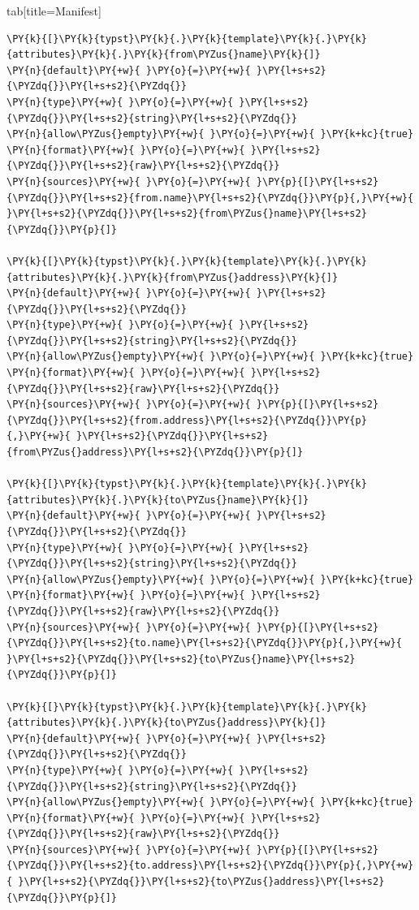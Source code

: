 \documentclass[a4paper,twoside]{article}
\begin{document}
\begin{tsdiv}{tab}[title=Manifest]
\begin{tscode}[lang=toml, engine=pygments]
\begin{Verbatim}[commandchars=\\\{\},breaklines, breakanywhere, commandchars=\\\{\}]
\PY{k}{[}\PY{k}{typst}\PY{k}{.}\PY{k}{template}\PY{k}{.}\PY{k}{attributes}\PY{k}{.}\PY{k}{from\PYZus{}name}\PY{k}{]}
\PY{n}{default}\PY{+w}{ }\PY{o}{=}\PY{+w}{ }\PY{l+s+s2}{\PYZdq{}}\PY{l+s+s2}{\PYZdq{}}
\PY{n}{type}\PY{+w}{ }\PY{o}{=}\PY{+w}{ }\PY{l+s+s2}{\PYZdq{}}\PY{l+s+s2}{string}\PY{l+s+s2}{\PYZdq{}}
\PY{n}{allow\PYZus{}empty}\PY{+w}{ }\PY{o}{=}\PY{+w}{ }\PY{k+kc}{true}
\PY{n}{format}\PY{+w}{ }\PY{o}{=}\PY{+w}{ }\PY{l+s+s2}{\PYZdq{}}\PY{l+s+s2}{raw}\PY{l+s+s2}{\PYZdq{}}
\PY{n}{sources}\PY{+w}{ }\PY{o}{=}\PY{+w}{ }\PY{p}{[}\PY{l+s+s2}{\PYZdq{}}\PY{l+s+s2}{from.name}\PY{l+s+s2}{\PYZdq{}}\PY{p}{,}\PY{+w}{ }\PY{l+s+s2}{\PYZdq{}}\PY{l+s+s2}{from\PYZus{}name}\PY{l+s+s2}{\PYZdq{}}\PY{p}{]}

\PY{k}{[}\PY{k}{typst}\PY{k}{.}\PY{k}{template}\PY{k}{.}\PY{k}{attributes}\PY{k}{.}\PY{k}{from\PYZus{}address}\PY{k}{]}
\PY{n}{default}\PY{+w}{ }\PY{o}{=}\PY{+w}{ }\PY{l+s+s2}{\PYZdq{}}\PY{l+s+s2}{\PYZdq{}}
\PY{n}{type}\PY{+w}{ }\PY{o}{=}\PY{+w}{ }\PY{l+s+s2}{\PYZdq{}}\PY{l+s+s2}{string}\PY{l+s+s2}{\PYZdq{}}
\PY{n}{allow\PYZus{}empty}\PY{+w}{ }\PY{o}{=}\PY{+w}{ }\PY{k+kc}{true}
\PY{n}{format}\PY{+w}{ }\PY{o}{=}\PY{+w}{ }\PY{l+s+s2}{\PYZdq{}}\PY{l+s+s2}{raw}\PY{l+s+s2}{\PYZdq{}}
\PY{n}{sources}\PY{+w}{ }\PY{o}{=}\PY{+w}{ }\PY{p}{[}\PY{l+s+s2}{\PYZdq{}}\PY{l+s+s2}{from.address}\PY{l+s+s2}{\PYZdq{}}\PY{p}{,}\PY{+w}{ }\PY{l+s+s2}{\PYZdq{}}\PY{l+s+s2}{from\PYZus{}address}\PY{l+s+s2}{\PYZdq{}}\PY{p}{]}

\PY{k}{[}\PY{k}{typst}\PY{k}{.}\PY{k}{template}\PY{k}{.}\PY{k}{attributes}\PY{k}{.}\PY{k}{to\PYZus{}name}\PY{k}{]}
\PY{n}{default}\PY{+w}{ }\PY{o}{=}\PY{+w}{ }\PY{l+s+s2}{\PYZdq{}}\PY{l+s+s2}{\PYZdq{}}
\PY{n}{type}\PY{+w}{ }\PY{o}{=}\PY{+w}{ }\PY{l+s+s2}{\PYZdq{}}\PY{l+s+s2}{string}\PY{l+s+s2}{\PYZdq{}}
\PY{n}{allow\PYZus{}empty}\PY{+w}{ }\PY{o}{=}\PY{+w}{ }\PY{k+kc}{true}
\PY{n}{format}\PY{+w}{ }\PY{o}{=}\PY{+w}{ }\PY{l+s+s2}{\PYZdq{}}\PY{l+s+s2}{raw}\PY{l+s+s2}{\PYZdq{}}
\PY{n}{sources}\PY{+w}{ }\PY{o}{=}\PY{+w}{ }\PY{p}{[}\PY{l+s+s2}{\PYZdq{}}\PY{l+s+s2}{to.name}\PY{l+s+s2}{\PYZdq{}}\PY{p}{,}\PY{+w}{ }\PY{l+s+s2}{\PYZdq{}}\PY{l+s+s2}{to\PYZus{}name}\PY{l+s+s2}{\PYZdq{}}\PY{p}{]}

\PY{k}{[}\PY{k}{typst}\PY{k}{.}\PY{k}{template}\PY{k}{.}\PY{k}{attributes}\PY{k}{.}\PY{k}{to\PYZus{}address}\PY{k}{]}
\PY{n}{default}\PY{+w}{ }\PY{o}{=}\PY{+w}{ }\PY{l+s+s2}{\PYZdq{}}\PY{l+s+s2}{\PYZdq{}}
\PY{n}{type}\PY{+w}{ }\PY{o}{=}\PY{+w}{ }\PY{l+s+s2}{\PYZdq{}}\PY{l+s+s2}{string}\PY{l+s+s2}{\PYZdq{}}
\PY{n}{allow\PYZus{}empty}\PY{+w}{ }\PY{o}{=}\PY{+w}{ }\PY{k+kc}{true}
\PY{n}{format}\PY{+w}{ }\PY{o}{=}\PY{+w}{ }\PY{l+s+s2}{\PYZdq{}}\PY{l+s+s2}{raw}\PY{l+s+s2}{\PYZdq{}}
\PY{n}{sources}\PY{+w}{ }\PY{o}{=}\PY{+w}{ }\PY{p}{[}\PY{l+s+s2}{\PYZdq{}}\PY{l+s+s2}{to.address}\PY{l+s+s2}{\PYZdq{}}\PY{p}{,}\PY{+w}{ }\PY{l+s+s2}{\PYZdq{}}\PY{l+s+s2}{to\PYZus{}address}\PY{l+s+s2}{\PYZdq{}}\PY{p}{]}


\end{Verbatim}
\end{tscode}
\end{tsdiv}
\end{document}
